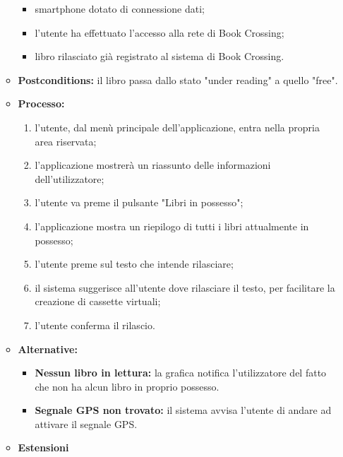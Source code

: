 \begin{itemize}
\begin{itemize}
		\begin{itemize}
			\item smartphone dotato di connessione dati;
			\item l’utente ha effettuato l’accesso alla rete di Book Crossing;
			\item libro rilasciato già registrato al sistema di Book Crossing.
		\end{itemize}
		\item \textbf{Postconditions:} il libro passa dallo stato "under reading" a quello "free".
		\item \textbf{Processo:}
		\begin{enumerate}
			\item l'utente, dal menù principale dell'applicazione, entra nella propria area riservata;
			\item l'applicazione mostrerà un riassunto delle informazioni dell'utilizzatore;
			\item l'utente va preme il pulsante "Libri in possesso";
			\item l'applicazione mostra un riepilogo di tutti i libri attualmente in possesso;
			\item  l'utente preme sul testo che intende rilasciare;
			\item il sistema suggerisce all'utente dove rilasciare il testo, per facilitare la creazione di cassette virtuali;
			\item l'utente conferma il rilascio.
		\end{enumerate}
		\item \textbf{Alternative:}
		\begin{itemize}
			\item \textbf{Nessun libro in lettura:} la grafica notifica l'utilizzatore del fatto che non ha alcun libro in proprio possesso.
			\item \textbf{Segnale GPS non trovato:} il sistema avvisa l'utente di andare ad attivare il segnale GPS.
		\end{itemize}
		\item \textbf{Estensioni}
	\end{itemize}
\end{itemize}